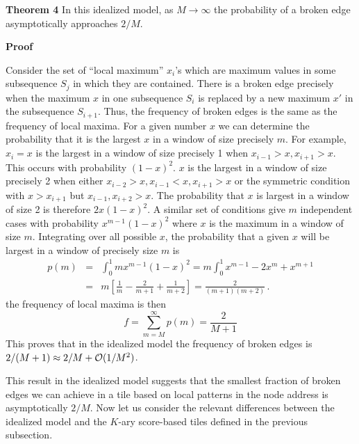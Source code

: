 \documentclass[12pt]{article}
\begin{document}
\noindent
{\bf Theorem 4} In this idealized model, as $M \rightarrow \infty$ the
probability of a broken edge asymptotically approaches $2/M$.

\vspace*{0.1in}

\noindent
{\bf Proof}

Consider the set of ``local maximum'' $x_i$'s which are maximum values
in some subsequence $S_j$ in which they are contained.  There is a
broken edge precisely when the maximum $x$ in one subsequence $S_i$ is
replaced by a new maximum $x'$ in the subsequence $S_{i + 1}$.  Thus,
the frequency of broken edges is the same as the frequency of local
maxima.  For a given number $x$ we can determine the probability that
it is the largest $x$ in a window of size precisely $m$.  For
example, $x_i = x$ is the largest in a window of size precisely 1
when $x_{i -1} > x, x_{i + 1}  > x$.  This occurs with probability
$(1-x)^2$.  $x$ is the largest in a window of size precisely 2 when either
$x_{i-2} > x, x_{i-1} < x, x_{i + 1} > x$ or the symmetric condition
with $x > x_{i + 1}$ but $x_{i -1}, x_{i + 2} > x$.  The probability
that $x$ is largest in a window of size 2 is therefore $2x (1-x)^2$.
A similar set of conditions give $m$ independent cases with
probability $x^{m -1} (1-x)^2$ where $x$ is the maximum in a window of
size $m$.  Integrating over all possible $x$, the probability that a
given $x$ will be largest in a window of precisely size $m$ is
\begin{eqnarray}
p (m) & = & \int_0^1 m x^{m -1} (1-x)^2
= m \int_0^1 x^{m- 1} -2x^m + x^{m + 1}\\
 & = & m \left[ \frac{1}{m}  - \frac{2}{m + 1}  + \frac{1}{m +2}  \right]
= \frac{2}{(m + 1) (m + 2)}  \,.
\end{eqnarray}
the frequency of local maxima is then 
\begin{equation}
f = \sum_{m = M}^{\infty}  p (m) = \frac{2}{M + 1} 
\end{equation}
This proves that in the idealized model the frequency of broken edges
is $2/(M + 1) \approx 2/M +{\cal O} (1/M^2)$.

\vspace*{0.1in}

This result in the idealized model suggests that the smallest fraction
of broken edges we can achieve in a tile based on local patterns in
the node address is asymptotically
$2/M$.  
Now let us consider the relevant differences between the idealized
model and the $K$-ary score-based tiles defined in the previous
subsection.
\end{document}
